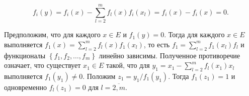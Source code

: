 \[
f_{i}(y)=f_{i}(x)-\sum_{l=2}^{m} f_{l}(x) f_{i}\left(x_{l}\right)=f_{i}(x)-f_{i}(x)=0 .
\]

Предположим, что для каждого $x \in E$ и $f_{1}(y)=0$. Тогда для каждого $x \in E$ выполняется $f_{1}(x)=\sum_{l=2}^{m} f_{l}(x) f_{1}\left(x_{l}\right)$, то есть $f_{1}=\sum_{l=2}^{m} f_{1}\left(x_{l}\right) f_{l}$ и функционалы $\left\{f_{1}, f_{2}, \ldots, f_{m}\right\}$ линейно зависимы. Полученное противоречие означает, что существует $x_{1} \in E$ такой, что для $y_{1}=x_{1}-\sum_{l=2}^{m} f_{l}\left(x_{1}\right) x_{l}$ выполняется $f_{1}\left(y_{1}\right) \neq 0$. Положим $z_{1}=y_{1} / f_{1}\left(y_{1}\right)$. Тогда $f_{1}\left(z_{1}\right)=1$ и одновременно $f_{l}\left(z_{1}\right)=0$ для $l=\overline{2, m}$.



